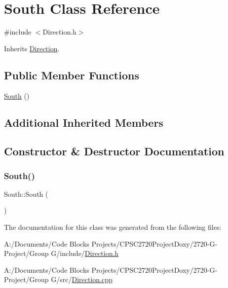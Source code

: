 \hypertarget{class_south}{}\section{South Class Reference}
\label{class_south}


{\ttfamily \#include $<$Direction.\+h$>$}



Inherits \mbox{\hyperlink{class_direction}{Direction}}.

\subsection*{Public Member Functions}
\begin{DoxyCompactItemize}
\item 
\mbox{\hyperlink{class_south_a5bb13912498d10d47a1a95fd748dd794}{South}} ()
\end{DoxyCompactItemize}
\subsection*{Additional Inherited Members}


\subsection{Constructor \& Destructor Documentation}
\mbox{\label{class_south_a5bb13912498d10d47a1a95fd748dd794}} 
\subsubsection{\texorpdfstring{South()}{South()}}
{\footnotesize\ttfamily South\+::\+South (\begin{DoxyParamCaption}{ }\end{DoxyParamCaption})}



The documentation for this class was generated from the following files\+:\begin{DoxyCompactItemize}
\item 
A\+:/\+Documents/\+Code Blocks Projects/\+C\+P\+S\+C2720\+Project\+Doxy/2720-\/\+G-\/\+Project/\+Group G/include/\mbox{\hyperlink{_direction_8h}{Direction.\+h}}\item 
A\+:/\+Documents/\+Code Blocks Projects/\+C\+P\+S\+C2720\+Project\+Doxy/2720-\/\+G-\/\+Project/\+Group G/src/\mbox{\hyperlink{_direction_8cpp}{Direction.\+cpp}}\end{DoxyCompactItemize}
